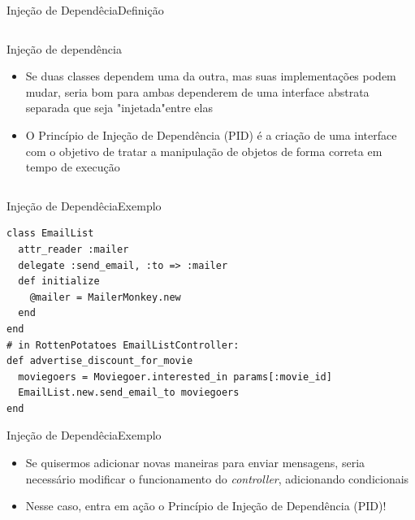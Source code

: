 \documentclass[10pt]{beamer}
\begin{document}

\begin{frame}{Injeção de Dependêcia}{Definição}
  \begin{columns}[T]
    \begin{column}{.9\textwidth}
      \begin{block}{Injeção de dependência}
      \begin{itemize}
      \item Se duas classes dependem uma da outra, mas suas implementações podem mudar, seria bom para ambas dependerem de uma interface abstrata separada que seja "injetada"\space entre elas
      \pause
      \item O Princípio de Injeção de Dependência (PID) é a criação de uma interface com o objetivo de tratar a manipulação de objetos de forma correta em tempo de execução
      \end{itemize}
      \end{block}
    \end{column}
\end{columns}

\end{frame}


\begin{frame}[fragile]{Injeção de Dependêcia}{Exemplo}

\begin{lstlisting}
class EmailList
  attr_reader :mailer
  delegate :send_email, :to => :mailer
  def initialize 
    @mailer = MailerMonkey.new
  end
end
# in RottenPotatoes EmailListController:
def advertise_discount_for_movie
  moviegoers = Moviegoer.interested_in params[:movie_id]
  EmailList.new.send_email_to moviegoers
end
\end{lstlisting}

\end{frame}


\begin{frame}{Injeção de Dependêcia}{Exemplo}

\begin{itemize}
  \item Se quisermos adicionar novas maneiras para enviar mensagens, seria necessário modificar o funcionamento do \textit{controller}, adicionando condicionais
  \item Nesse caso, entra em ação o Princípio de Injeção de Dependência (PID)!
\end{itemize}

\end{frame}
\end{document}
